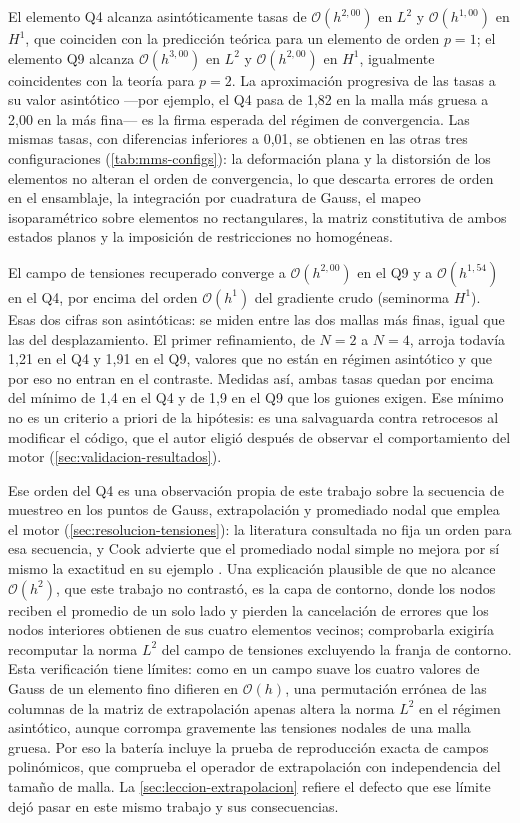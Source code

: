 El elemento Q4 alcanza asintóticamente tasas de $\mathcal{O}(h^{2{,}00})$ en $L^2$ y $\mathcal{O}(h^{1{,}00})$ en $H^1$, que coinciden con la predicción teórica para un elemento de orden $p=1$; el elemento Q9 alcanza $\mathcal{O}(h^{3{,}00})$ en $L^2$ y $\mathcal{O}(h^{2{,}00})$ en $H^1$, igualmente coincidentes con la teoría para $p=2$. La aproximación progresiva de las tasas a su valor asintótico ---por ejemplo, el Q4 pasa de 1,82 en la malla más gruesa a 2,00 en la más fina--- es la firma esperada del régimen de convergencia. Las mismas tasas, con diferencias inferiores a 0,01, se obtienen en las otras tres configuraciones (\autoref{tab:mms-configs}): la deformación plana y la distorsión de los elementos no alteran el orden de convergencia, lo que descarta errores de orden en el ensamblaje, la integración por cuadratura de Gauss, el mapeo isoparamétrico sobre elementos no rectangulares, la matriz constitutiva de ambos estados planos y la imposición de restricciones no homogéneas.

El campo de tensiones recuperado converge a $\mathcal{O}(h^{2{,}00})$ en el Q9 y a $\mathcal{O}(h^{1{,}54})$ en el Q4, por encima del orden $\mathcal{O}(h^{1})$ del gradiente crudo (seminorma $H^1$). Esas dos cifras son asintóticas: se miden entre las dos mallas más finas, igual que las del desplazamiento. El primer refinamiento, de $N=2$ a $N=4$, arroja todavía 1,21 en el Q4 y 1,91 en el Q9, valores que no están en régimen asintótico y que por eso no entran en el contraste. Medidas así, ambas tasas quedan por encima del mínimo de 1,4 en el Q4 y de 1,9 en el Q9 que los guiones exigen. Ese mínimo no es un criterio a priori de la hipótesis: es una salvaguarda contra retrocesos al modificar el código, que el autor eligió después de observar el comportamiento del motor (\autoref{sec:validacion-resultados}).

Ese orden del Q4 es una observación propia de este trabajo sobre la secuencia de muestreo en los puntos de Gauss, extrapolación y promediado nodal que emplea el motor (\autoref{sec:resolucion-tensiones}): la literatura consultada no fija un orden para esa secuencia, y Cook advierte que el promediado nodal simple no mejora por sí mismo la exactitud en su ejemplo \autocite[p.~231]{cook2002concepts}. Una explicación plausible de que no alcance $\mathcal{O}(h^{2})$, que este trabajo no contrastó, es la capa de contorno, donde los nodos reciben el promedio de un solo lado y pierden la cancelación de errores que los nodos interiores obtienen de sus cuatro elementos vecinos; comprobarla exigiría recomputar la norma $L^2$ del campo de tensiones excluyendo la franja de contorno. Esta verificación tiene límites: como en un campo suave los cuatro valores de Gauss de un elemento fino difieren en $\mathcal{O}(h)$, una permutación errónea de las columnas de la matriz de extrapolación apenas altera la norma $L^2$ en el régimen asintótico, aunque corrompa gravemente las tensiones nodales de una malla gruesa. Por eso la batería incluye la prueba de reproducción exacta de campos polinómicos, que comprueba el operador de extrapolación con independencia del tamaño de malla. La \autoref{sec:leccion-extrapolacion} refiere el defecto que ese límite dejó pasar en este mismo trabajo y sus consecuencias.

